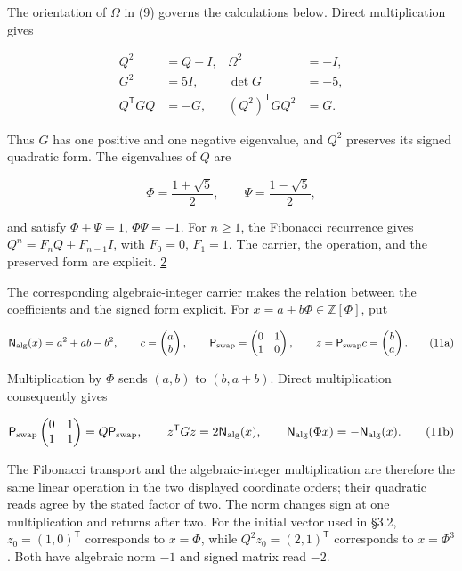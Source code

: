 The orientation of \(\Omega\) in (9) governs the calculations below. Direct multiplication gives

\[
\begin{aligned}
Q^2&=Q+I,& \Omega^2&=-I,\\
G^2&=5I,& \det G&=-5,\\
Q^{\mathsf T}GQ&=-G,&
(Q^2)^{\mathsf T}GQ^2&=G.
\end{aligned}
\tag{10}
\]

Thus \(G\) has one positive and one negative eigenvalue, and \(Q^2\) preserves its signed quadratic form. The eigenvalues of \(Q\) are

\[
\Phi=\frac{1+\sqrt5}{2},
\qquad
\Psi=\frac{1-\sqrt5}{2},
\tag{11}
\]

and satisfy \(\Phi+\Psi=1\), \(\Phi\Psi=-1\). For \(n\geq1\), the Fibonacci recurrence gives \(Q^n=F_nQ+F_{n-1}I\), with \(F_0=0\), \(F_1=1\). The carrier, the operation, and the preserved form are explicit. \href{https://doi.org/10.5281/zenodo.23697265}{2}

The corresponding algebraic-integer carrier makes the relation between the coefficients and the signed form explicit. For \(x=a+b\Phi\in\mathbb Z[\Phi]\), put

\[
\mathsf N_{\rm alg}(x)=a^2+ab-b^2,\qquad
c=\begin{pmatrix}a\\b\end{pmatrix},\qquad
\mathsf P_{\rm swap}=\begin{pmatrix}0&1\\1&0\end{pmatrix},\qquad
z=\mathsf P_{\rm swap}c=\begin{pmatrix}b\\a\end{pmatrix}.
\tag{11a}
\]

Multiplication by \(\Phi\) sends \((a,b)\) to \((b,a+b)\). Direct multiplication consequently gives

\[
\mathsf P_{\rm swap}
\begin{pmatrix}0&1\\1&1\end{pmatrix}
=Q\mathsf P_{\rm swap},\qquad
z^{\mathsf T}Gz=2\mathsf N_{\rm alg}(x),\qquad
\mathsf N_{\rm alg}(\Phi x)=-\mathsf N_{\rm alg}(x).
\tag{11b}
\]

The Fibonacci transport and the algebraic-integer multiplication are therefore the same linear operation in the two displayed coordinate orders; their quadratic reads agree by the stated factor of two. The norm changes sign at one multiplication and returns after two. For the initial vector used in §3.2, \(z_0=(1,0)^{\mathsf T}\) corresponds to \(x=\Phi\), while \(Q^2z_0=(2,1)^{\mathsf T}\) corresponds to \(x=\Phi^3\). Both have algebraic norm \(-1\) and signed matrix read \(-2\).

